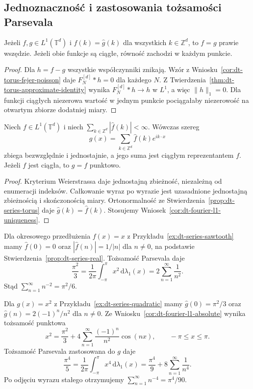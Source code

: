 \subsection{Jednoznaczność i zastosowania tożsamości Parsevala}

\begin{wniosek}
\label{cor:dt-fourier-l1-uniqueness}
Jeżeli $f,g\in L^1(\mathbb T^d)$ i
$\widehat f(k)=\widehat g(k)$ dla wszystkich
$k\in\mathbb Z^d$, to $f=g$ prawie wszędzie.
Jeżeli obie funkcje są ciągłe, równość zachodzi
w każdym punkcie.
\end{wniosek}
\begin{proof}
Dla $h=f-g$ wszystkie współczynniki znikają.
Wzór z Wniosku~\ref{cor:dt-torus-fejer-poisson}
daje $F_N^{[d]}*h=0$ dla każdego $N$.
Z Twierdzenia~\ref{thm:dt-torus-approximate-identity}
wynika $F_N^{[d]}*h\to h$ w $L^1$, a więc
$\|h\|_1=0$. Dla funkcji ciągłych niezerowa
wartość w jednym punkcie pociągałaby
niezerowość na otwartym zbiorze dodatniej miary.
\end{proof}

\begin{wniosek}
\label{cor:dt-fourier-l1-absolute}
Niech $f\in L^1(\mathbb T^d)$ i niech
$\sum_{k\in\mathbb Z^d}|\widehat f(k)|<\infty$.
Wówczas szereg
\[
 g(x)=\sum_{k\in\mathbb Z^d}\widehat f(k)e^{ik\cdot x}
\]
zbiega bezwzględnie i jednostajnie, a jego suma
jest ciągłym reprezentantem $f$.
Jeżeli $f$ jest ciągła, to $g=f$ punktowo.
\end{wniosek}
\begin{proof}
Kryterium Weierstrassa daje jednostajną
zbieżność, niezależną od enumeracji indeksów.
Całkowanie wyraz po wyrazie jest uzasadnione
jednostajną zbieżnością i skończonością miary.
Ortonormalność ze Stwierdzenia~\ref{prop:dt-series-torus}
daje $\widehat g(k)=\widehat f(k)$.
Stosujemy Wniosek~\ref{cor:dt-fourier-l1-uniqueness}.
\end{proof}

\begin{przyklad}
\label{ex:dt-parseval-zeta}
Dla okresowego przedłużenia $f(x)=x$ z
Przykładu~\ref{ex:dt-series-sawtooth}
mamy $\widehat f(0)=0$ oraz
$|\widehat f(n)|=1/|n|$ dla $n\ne0$,
na podstawie Stwierdzenia~\ref{prop:dt-series-real}.
Tożsamość Parsevala daje
\[
 \frac{\pi^2}{3}
 =\frac1{2\pi}\int_{-\pi}^{\pi}x^2\,\mathrm d\lambda_1(x)
 =2\sum_{n=1}^{\infty}\frac1{n^2}.
\]
Stąd $\sum_{n=1}^{\infty}n^{-2}=\pi^2/6$.

Dla $g(x)=x^2$ z Przykładu~\ref{ex:dt-series-quadratic}
mamy $\widehat g(0)=\pi^2/3$ oraz
$\widehat g(n)=2(-1)^n/n^2$ dla $n\ne0$.
Ze Wniosku~\ref{cor:dt-fourier-l1-absolute}
wynika tożsamość punktowa
\[
 x^2=\frac{\pi^2}{3}+4\sum_{n=1}^\infty
 \frac{(-1)^n}{n^2}\cos(nx),\qquad -\pi\le x\le\pi.
\]
Tożsamość Parsevala zastosowana do $g$ daje
\[
 \frac{\pi^4}{5}
 =\frac1{2\pi}\int_{-\pi}^{\pi}x^4\,\mathrm d\lambda_1(x)
 =\frac{\pi^4}{9}+8\sum_{n=1}^{\infty}\frac1{n^4}.
\]
Po odjęciu wyrazu stałego otrzymujemy
$\sum_{n=1}^{\infty}n^{-4}=\pi^4/90$.
\end{przyklad}

